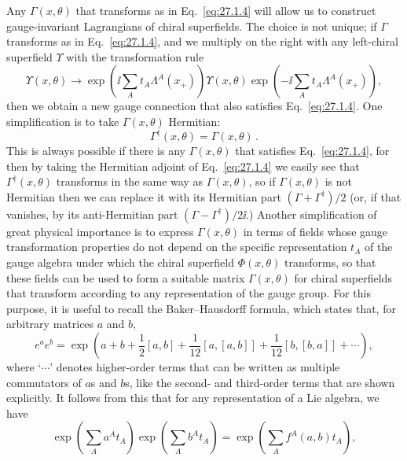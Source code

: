 Any \(\Gamma(x,\theta)\) that transforms as in Eq.~\eqref{eq:27.1.4} will
allow us to construct gauge-invariant Lagrangians of chiral superfields.
The choice is not unique; if \(\Gamma\) transforms as in
Eq.~\eqref{eq:27.1.4}, and we multiply on the right with any left-chiral
superfield \(\Upsilon\) with the transformation rule
\[
  \Upsilon(x,\theta)\longrightarrow
  \exp\left(\ii\sum_A t_A\Lambda^A(x_+)\right)
  \Upsilon(x,\theta)
  \exp\left(-\ii\sum_A t_A\Lambda^A(x_+)\right),
\]
then we obtain a new gauge connection that also satisfies
Eq.~\eqref{eq:27.1.4}. One simplification is to take
\(\Gamma(x,\theta)\) Hermitian:
\begin{equation}
  \Gamma^\dagger(x,\theta)=\Gamma(x,\theta)\,.
  \tag{27.1.6}\label{eq:27.1.6}
\end{equation}
This is always possible if there is any \(\Gamma(x,\theta)\) that satisfies
Eq.~\eqref{eq:27.1.4}, for then by taking the Hermitian adjoint of
Eq.~\eqref{eq:27.1.4} we easily see that \(\Gamma^\dagger(x,\theta)\)
transforms in the same way as \(\Gamma(x,\theta)\), so if
\(\Gamma(x,\theta)\) is not Hermitian then we can replace it with its
Hermitian part \((\Gamma+\Gamma^\dagger)/2\) (or, if that vanishes, by its
anti-Hermitian part \((\Gamma-\Gamma^\dagger)/2\ii\).) Another simplification
of great physical importance is to express \(\Gamma(x,\theta)\) in terms
of fields whose gauge transformation properties do not depend on the
specific representation \(t_A\) of the gauge algebra under which the
chiral superfield \(\Phi(x,\theta)\) transforms, so that these fields can
be used to form a suitable matrix \(\Gamma(x,\theta)\) for chiral
superfields that transform according to any representation of the gauge
group. For this purpose, it is useful to recall the Baker--Hausdorff
formula, which states that, for arbitrary matrices \(a\) and \(b\),
\begin{equation}
  e^a e^b
  =\exp\left(
    a+b+\frac12[a,b]
    +\frac1{12}[a,[a,b]]
    +\frac1{12}[b,[b,a]]
    +\cdots
  \right),
  \tag{27.1.7}\label{eq:27.1.7}
\end{equation}
where `\(\cdots\)' denotes higher-order terms that can be written as
multiple commutators of \(a\)s and \(b\)s, like the second- and third-order
terms that are shown explicitly. It follows from this that for any
representation of a Lie algebra, we have
\begin{equation}
  \exp\left(\sum_A a^A t_A\right)
  \exp\left(\sum_A b^A t_A\right)
  =\exp\left(\sum_A f^A(a,b)t_A\right),
  \tag{27.1.8}\label{eq:27.1.8}
\end{equation}
